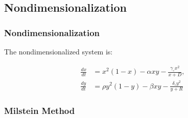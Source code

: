 
\subsection{Nondimensionalization}

\begin{frame}
\frametitle{Nondimensionalization}

  The nondimensionalized system is:

	\begin{align*}
		\frac{dx}{dt} &= x^2 (1-x) - \alpha xy - \frac{\gamma_\circ x^2}{x+D}, \\
    \frac{dy}{dt} &= \rho y^2 (1-y) - \beta xy -\frac{\delta_\circ y^2}{y+R}
	\end{align*}
\end{frame}

\begin{frame}
  \frametitle{Milstein Method}

\begin{center}
\end{center}

\vfill
\end{frame}



